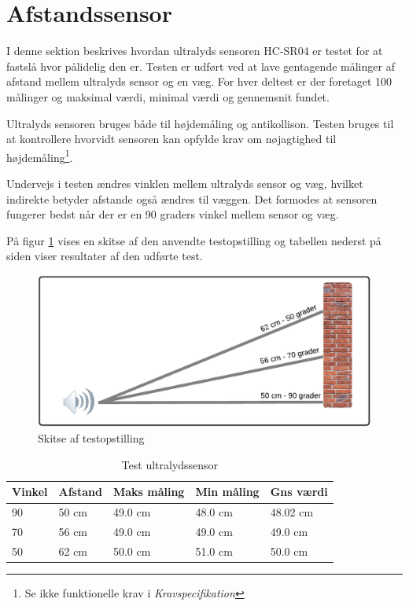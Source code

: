 \section{Afstandssensor}

I denne sektion beskrives hvordan ultralyds sensoren HC-SR04 er testet for at fastslå hvor pålidelig den er. Testen er udført ved at lave gentagende målinger af afstand mellem ultralyds sensor og en væg. For hver deltest er der foretaget 100 målinger og maksimal værdi, minimal værdi og gennemsnit fundet. 

Ultralyds sensoren bruges både til højdemåling og antikollison. Testen bruges til at kontrollere hvorvidt sensoren kan opfylde krav om nøjagtighed til højdemåling\footnote{Se ikke funktionelle krav i \textit{Kravspecifikation}}. 

Undervejs i testen ændres vinklen mellem ultralyds sensor og væg, hvilket indirekte betyder afstande også ændres til væggen. Det formodes at sensoren fungerer bedst når der er en 90 graders vinkel mellem sensor og væg. 

På figur \ref{fig:ultra_testopstilling} vises en skitse af den anvendte testopstilling og tabellen nederst på siden viser resultater af den udførte test.

\begin{figure}[H]
\centering
\includegraphics[width=1\textwidth]{Billeder/Test/ultrasound.png}
\caption{Skitse af testopstilling}
\label{fig:ultra_testopstilling}
\end{figure}

\vspace{0.5cm}

\begin{table}[H]
\begin{tabular}{| p{2.5cm}| p{2.5cm}| p{2.5cm}| p{2.5cm}| p{2.5cm}|}
\hline
\textbf{Vinkel} & \textbf{Afstand} & \textbf{Maks måling} & \textbf{Min måling}  & \textbf{Gns værdi} \\ \hline
90 & 50 cm & 49.0 cm & 48.0 cm  & 48.02 cm \\ \hline
70 & 56 cm & 49.0 cm & 49.0 cm  & 49.0 cm \\ \hline
50 & 62 cm & 50.0 cm & 51.0 cm  & 50.0 cm \\ \hline

\end{tabular}
\caption{Test ultralydssensor}
\label{tab:Ultralyds_test}
\end{table}



